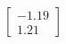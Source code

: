 \documentclass[preview]{standalone}
\begin{document}
\begin{align*}
\begin{bmatrix} -1.19 \\ 1.21 \end{bmatrix}
\end{align*}
\end{document}
